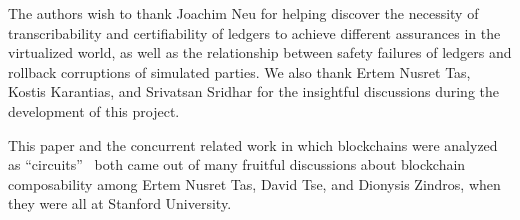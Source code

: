\appsection[Acknowledgements]

The authors wish to thank Joachim Neu for helping discover
the necessity of transcribability and certifiability of ledgers to achieve
different assurances in the virtualized world,
as well as the relationship between safety failures of ledgers
and rollback corruptions of simulated parties.
We also thank Ertem Nusret Tas, Kostis Karantias, and
Srivatsan Sridhar for the insightful discussions during the development of this
project.

This paper and the concurrent related work in which blockchains were analyzed
as ``circuits''~\cite{circuits} both came out of many fruitful discussions about
blockchain composability among Ertem Nusret Tas, David Tse, and Dionysis Zindros, when
they were all at Stanford University.